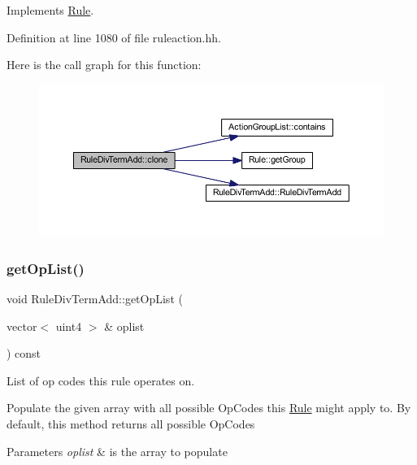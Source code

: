 Implements \mbox{\hyperlink{class_rule_a70de90a76461bfa7ea0b575ce3c11e4d}{Rule}}.



Definition at line 1080 of file ruleaction.\+hh.

Here is the call graph for this function\+:
\nopagebreak
\begin{figure}[H]
\begin{center}
\leavevmode
\includegraphics[width=350pt]{class_rule_div_term_add_a28bccfa9d7315e4e2493302bb18f4691_cgraph}
\end{center}
\end{figure}
\mbox{\label{class_rule_div_term_add_a151f25f34a814b53139fb9860d70ce9b}} 
\subsubsection{\texorpdfstring{getOpList()}{getOpList()}}
{\footnotesize\ttfamily void Rule\+Div\+Term\+Add\+::get\+Op\+List (\begin{DoxyParamCaption}\item[{vector$<$ uint4 $>$ \&}]{oplist }\end{DoxyParamCaption}) const\hspace{0.3cm}{\ttfamily [virtual]}}



List of op codes this rule operates on. 

Populate the given array with all possible Op\+Codes this \mbox{\hyperlink{class_rule}{Rule}} might apply to. By default, this method returns all possible Op\+Codes 
\begin{DoxyParams}{Parameters}
{\em oplist} & is the array to populate \\
\hline
\end{DoxyParams}



